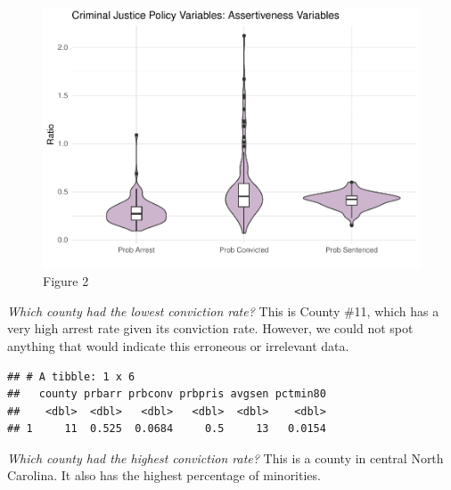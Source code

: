\documentclass[]{article}
\newenvironment{Shaded}{\begin{snugshade}}{\end{snugshade}}
\newcommand{\KeywordTok}[1]{\textcolor[rgb]{0.13,0.29,0.53}{\textbf{#1}}}
\newcommand{\NormalTok}[1]{#1}
\newcommand{\OperatorTok}[1]{\textcolor[rgb]{0.81,0.36,0.00}{\textbf{#1}}}
\newcommand{\StringTok}[1]{\textcolor[rgb]{0.31,0.60,0.02}{#1}}
\begin{document}
\begin{figure}

{\centering \includegraphics{lab_3_final_files/figure-latex/unnamed-chunk-12-1} 

}

\caption{Figure 2}\label{fig:unnamed-chunk-12}
\end{figure}

\emph{Which county had the lowest conviction rate?} This is County \#11,
which has a very high arrest rate given its conviction rate. However, we
could not spot anything that would indicate this erroneous or irrelevant
data.

\begin{Shaded}
\end{Shaded}

\begin{verbatim}
## # A tibble: 1 x 6
##   county prbarr prbconv prbpris avgsen pctmin80
##    <dbl>  <dbl>   <dbl>   <dbl>  <dbl>    <dbl>
## 1     11  0.525  0.0684     0.5     13   0.0154
\end{verbatim}

\emph{Which county had the highest conviction rate?} This is a county in
central North Carolina. It also has the highest percentage of
minorities.

\begin{Shaded}
\end{Shaded}
\end{document}

